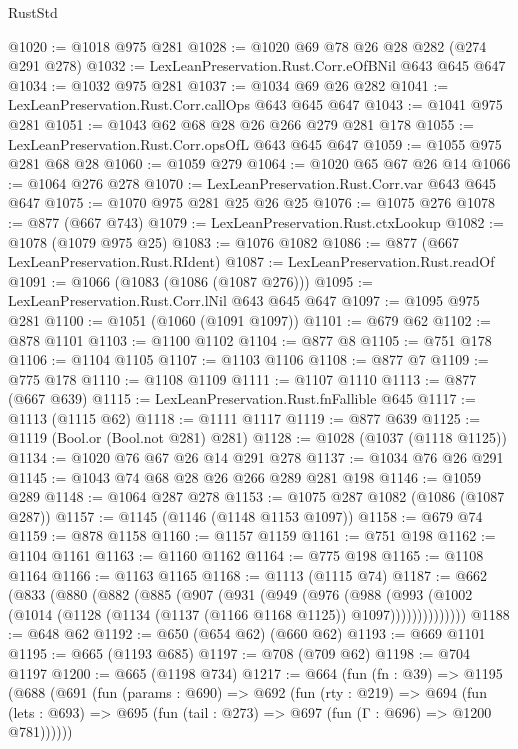 \begin{lexlean}{RustStd}
\begin{coremodule}
{\begin{coremodule}
{{{{{{{@1020 := @1018 @975 @281
@1028 := @1020 @69 @78 @26 @28 @282 (@274 @291 @278)
@1032 := LexLeanPreservation.Rust.Corr.eOfBNil @643 @645 @647
@1034 := @1032 @975 @281
@1037 := @1034 @69 @26 @282
@1041 := LexLeanPreservation.Rust.Corr.callOps @643 @645 @647
@1043 := @1041 @975 @281
@1051 := @1043 @62 @68 @28 @26 @266 @279 @281 @178
@1055 := LexLeanPreservation.Rust.Corr.opsOfL @643 @645 @647
@1059 := @1055 @975 @281 @68 @28
@1060 := @1059 @279
@1064 := @1020 @65 @67 @26 @14
@1066 := @1064 @276 @278
@1070 := LexLeanPreservation.Rust.Corr.var @643 @645 @647
@1075 := @1070 @975 @281 @25 @26 @25
@1076 := @1075 @276
@1078 := @877 (@667 @743)
@1079 := LexLeanPreservation.Rust.ctxLookup
@1082 := @1078 (@1079 @975 @25)
@1083 := @1076 @1082
@1086 := @877 (@667 LexLeanPreservation.Rust.RIdent)
@1087 := LexLeanPreservation.Rust.readOf
@1091 := @1066 (@1083 (@1086 (@1087 @276)))
@1095 := LexLeanPreservation.Rust.Corr.lNil @643 @645 @647
@1097 := @1095 @975 @281
@1100 := @1051 (@1060 (@1091 @1097))
@1101 := @679 @62
@1102 := @878 @1101
@1103 := @1100 @1102
@1104 := @877 @8
@1105 := @751 @178
@1106 := @1104 @1105
@1107 := @1103 @1106
@1108 := @877 @7
@1109 := @775 @178
@1110 := @1108 @1109
@1111 := @1107 @1110
@1113 := @877 (@667 @639)
@1115 := LexLeanPreservation.Rust.fnFallible @645
@1117 := @1113 (@1115 @62)
@1118 := @1111 @1117
@1119 := @877 @639
@1125 := @1119 (Bool.or (Bool.not @281) @281)
@1128 := @1028 (@1037 (@1118 @1125))
@1134 := @1020 @76 @67 @26 @14 @291 @278
@1137 := @1034 @76 @26 @291
@1145 := @1043 @74 @68 @28 @26 @266 @289 @281 @198
@1146 := @1059 @289
@1148 := @1064 @287 @278
@1153 := @1075 @287 @1082 (@1086 (@1087 @287))
@1157 := @1145 (@1146 (@1148 @1153 @1097))
@1158 := @679 @74
@1159 := @878 @1158
@1160 := @1157 @1159
@1161 := @751 @198
@1162 := @1104 @1161
@1163 := @1160 @1162
@1164 := @775 @198
@1165 := @1108 @1164
@1166 := @1163 @1165
@1168 := @1113 (@1115 @74)
@1187 := @662
    (@833
      (@880
        (@882
          (@885
            (@907
              (@931
                (@949
                  (@976
                    (@988
                      (@993
                        (@1002 (@1014 (@1128 (@1134 (@1137 (@1166 @1168 @1125)) @1097))))))))))))))
@1188 := @648 @62
@1192 := @650 (@654 @62) (@660 @62)
@1193 := @669 @1101
@1195 := @665 (@1193 @685)
@1197 := @708 (@709 @62)
@1198 := @704 @1197
@1200 := @665 (@1198 @734)
@1217 := @664
    (fun (fn : @39) =>
    @1195
      (@688
        (@691
          (fun (params : @690) =>
          @692
            (fun (rty : @219) =>
            @694
              (fun (lets : @693) =>
              @695 (fun (tail : @273) => @697 (fun (Γ : @696) => @1200 @781))))))
}}}}}}}
\end{coremodule}}
\end{coremodule}
\end{lexlean}
